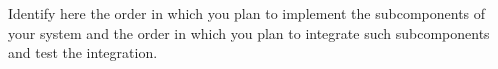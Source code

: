  Identify here the order in which you plan to implement the subcomponents of your system and the order in which you plan to integrate such subcomponents and test the integration.